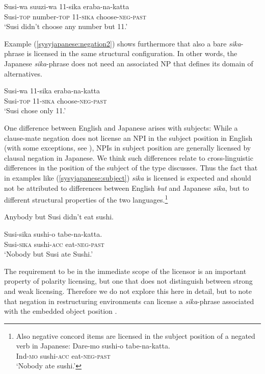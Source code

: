 \documentclass[output=paper,colorlinks,citecolor=brown,
]{langscibook}
\def\refp#1{(\ref{sy#1})}
\def\M#1{\textsc{#1}}
\begin{document}
\ea \label{syjapanese:negation1}
\gll Susi-wa suuzi-wa 11-sika eraba-na-katta\\
     Susi-\M{top} number-\M{top} 11-\M{sika} choose-\M{neg}-\M{past}\\
\glt `Susi didn't choose any number but 11.'\z

Example \refp{syjapanese:negation2} shows furthermore that also a bare \emph{sika}-phrase is licensed in the same structural configuration. In other words, the Japanese \emph{sika}-phrase does not need an associated NP that defines its domain of alternatives.

\ea \label{syjapanese:negation2}
\gll Susi-wa 11-sika eraba-na-katta\\
     Susi-\textsc{top} 11-\textsc{sika} choose-\M{neg}-\textsc{past}\\
\glt `Susi chose only 11.'\z


One difference between English and Japanese arises with subjects:
While a clause-mate negation does not license an NPI in the subject position in English (with some exceptions, see \citealt{uribe95a}), NPIs in subject position are generally licensed by clausal negation in Japanese.
We think such differences relate to cross-linguistic differences in the position of the subject of the type \cite{wurmbrand06a} discusses.
Thus the fact that in examples like \refp{syjapanese:subject} \emph{sika} is licensed is expected and should not be attributed to differences between English \emph{but} and Japanese \emph{sika}, but to different structural properties of the two languages.\footnote{Also negative concord items are licensed in the subject position of a negated verb in Japanese:
\ea \label{syNegQ-1}
\gll Dare-mo sushi-o tabe-na-katta.\\
Ind-\M{mo} sushi-\M{acc} eat-\M{neg}-\M{past}\\
\glt `Nobody ate sushi.'\z}

\ea *Anybody but Susi didn't eat sushi.\z

\ea \label{syjapanese:subject}
\gll Susi-sika sushi-o tabe-na-katta.\\
Susi-\M{sika} sushi-\M{acc} eat-\M{neg-past}\\
\glt `Nobody but Susi ate Sushi.'\z


The requirement to be in the immediate scope of the licensor is an important property of polarity licensing, but one that does not distinguish between strong and weak licensing.
Therefore we do not explore this here in detail, but to note that negation in restructuring environments \citep{wurmbrand01b} can license a  \emph{sika}-phrase associated with the embedded object position \citep{muraki78}.
\end{document}
